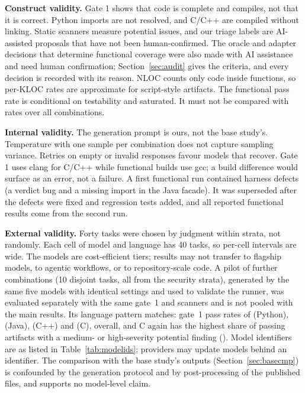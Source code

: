 \documentclass[conference]{IEEEtran}
\begin{document}
\textbf{Construct validity.} Gate 1 shows that code is complete and compiles,
not that it is correct. Python imports are not resolved, and C/C++ are compiled
without linking. Static scanners measure potential issues, and our triage
labels are AI-assisted proposals that have not been human-confirmed. The
oracle and adapter decisions that determine functional coverage were also made
with AI assistance and need human confirmation; Section~\ref{sec:audit} gives
the criteria, and every decision is recorded with its reason. NLOC counts
only code inside functions, so per-KLOC rates are approximate for script-style
artifacts. The functional pass rate is conditional on testability and saturated.
It must not be compared with rates over all \nPlanned{} combinations.

\textbf{Internal validity.} The generation prompt is ours, not the base study's.
Temperature \temperature{} with one sample per combination does not capture
sampling variance. Retries on empty or invalid responses favour models that
recover. Gate 1 uses clang for C/C++ while functional builds use gcc; a build
difference would surface as an error, not a failure. A first functional run
contained harness defects (a verdict bug and a missing import in the Java
facade). It was superseded after the defects were fixed and regression tests
added, and all reported functional results come from the second run.

\textbf{External validity.} Forty tasks were chosen by judgment within strata,
not randomly. Each cell of model and language has 40 tasks, so per-cell
intervals are wide. The models are cost-efficient tiers; results may not
transfer to flagship models, to agentic workflows, or to repository-scale code.
A pilot of \pilotPlanned{} further combinations (10 disjoint tasks, all from the
security strata), generated by the same five models with identical settings and
used to validate the runner, was evaluated separately with the same gate~1 and scanners and is not
pooled with the main results. Its language pattern matches: gate~1 pass rates
of \pilotGOnePy{} (Python), \pilotGOneJava{} (Java), \pilotGOneCpp{} (C++) and
\pilotGOneC{} (C), \pilotGOnePass{} overall, and C again has the highest share
of passing artifacts with a medium- or high-severity potential finding
(\pilotMedHighC{}).
Model identifiers are as listed in Table~\ref{tab:modelids}; providers may
update models behind an identifier. The comparison with the base study's
outputs (Section~\ref{sec:basecmp}) is confounded by the generation protocol and
by post-processing of the published files, and supports no model-level claim.
\end{document}
